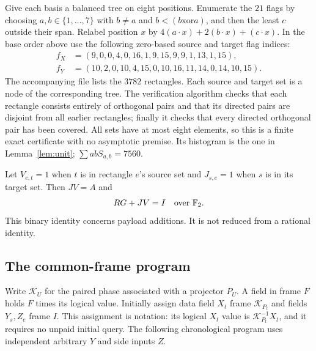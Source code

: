Give each basis a balanced tree on eight positions. Enumerate the
$21$ flags by choosing $a,b\in\{1,\ldots,7\}$ with $b\ne a$ and
$b<(b\mathbin{\mathrm{xor}}a)$, and then the least $c$ outside their
span. Relabel position $x$ by
$4(a\cdot x)+2(b\cdot x)+(c\cdot x)$. In the base order above use
the following zero-based source and target flag indices:
\[
\begin{split}
 f_X&=(9,0,0,4,0,16,1,9,15,9,9,1,13,1,15),\\
 f_Y&=(10,2,0,10,4,15,0,10,16,11,14,0,14,10,15).
\end{split}
\]
The accompanying file 
lists the $3782$ rectangles. Each source and target set is a node
of the corresponding tree. The verification algorithm checks that
each rectangle consists entirely of orthogonal pairs and that its
directed pairs are disjoint from all earlier rectangles; finally it
checks that every directed orthogonal pair has been covered. All
sets have at most eight elements, so this is a finite exact
certificate with no asymptotic premise. Its histogram is the one in
Lemma~\ref{lem:unit}; $\sum abS_{a,b}=7560$.

Let $V_{e,t}=1$ when $t$ is in rectangle $e$'s source set and
$J_{s,e}=1$ when $s$ is in its target set. Then $JV=A$ and
\begin{equation}
 RG+JV=I\quad\text{over }\mathbb F_2.\label{eq:binary-incidence}
\end{equation}
This binary identity concerns payload additions. It is not reduced
from a rational identity.

\subsection{The common-frame program}
Write $\mathcal K_U$ for the paired phase associated with a projector
$P_U$. A field in frame $F$ holds $F$ times its logical value.
Initially assign data field $X_t$ frame $\mathcal K_{P_t}$ and
fields $Y_s,Z_e$ frame $I$. This assignment is notation: its logical
$X_t$ value is $\mathcal K_{P_t}^{-1}X_t$, and it requires no unpaid
initial query. The following chronological program uses independent
arbitrary $Y$ and side inputs $Z$.

